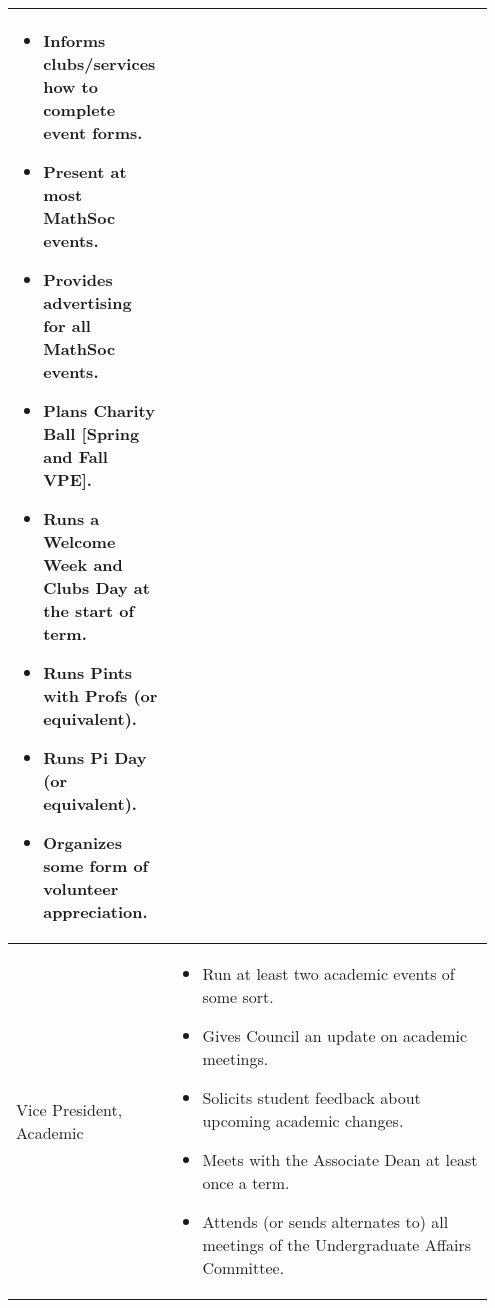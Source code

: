 \begin{longtable}{p{0.3\linewidth} p{0.65\linewidth}}
\begin{itemize}
\item Informs clubs/services how to complete event forms.
\item Present at most MathSoc events.
\item Provides advertising for all MathSoc events.
\item Plans Charity Ball [Spring and Fall VPE].
\item Runs a Welcome Week and Clubs Day at the start of term.
\item Runs Pints with Profs (or equivalent).
\item Runs Pi Day (or equivalent).
\item Organizes some form of volunteer appreciation.
\end{itemize}
\\
\midrule
Vice President, Academic &
\begin{itemize}
\item Run at least two academic events of some sort.
\item Gives Council an update on academic meetings.
\item Solicits student feedback about upcoming academic changes.
\item Meets with the Associate Dean at least once a term.
\item Attends (or sends alternates to) all meetings of the Undergraduate Affairs Committee.
\end{itemize}
\\
\bottomrule
\end{longtable}